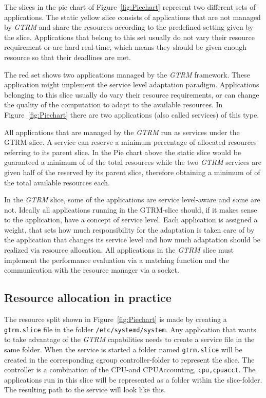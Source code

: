 \documentclass[nobiblatex]{LTHthesis}
\begin{document}
The slices in the pie chart of Figure~\ref{fig:Piechart} represent two
different sets of applications. The static yellow slice consists of
applications that are not managed by \emph{GTRM} and share the resources
according to the predefined setting given by the slice. Applications
that belong to this set usually do not vary their resource requirement
or are hard real-time, which means they should be given enough resource
so that their deadlines are met. 

The red set shows two applications managed by the \emph{GTRM} framework. These
application might implement the service level adaptation paradigm.
Applications belonging to this slice usually do vary their resource
requirements, or can change the quality of the computation to adapt to the
available resources. In Figure~\ref{fig:Piechart} there are two applications
(also called services) of this type.

All applications that are managed by the \emph{GTRM} run as services under the 
GTRM-slice. A service can reserve a minimum percentage of allocated 
resources referring to its parent slice.
In the Pie chart above the static slice would be guaranteed a minimum of 
 of the total resources while the two \emph{GTRM} services are given 
half of the  reserved by its parent slice, therefore obtaining
a minimum of  of the total available resources each.

In the \emph{GTRM} slice, some of the applications are service level-aware and some
 are not. Ideally all applications running in the GTRM-slice should, 
if it makes sense to the application, have a concept of service level.
Each application is assigned a weight, that sets how much responsibility
for the adaptation is taken care of by the application that changes its service
level and how much adaptation should be realized via resource allocation.
All applications in the \emph{GTRM} slice must implement the performance evaluation
via a matching function and the communication with the resource manager via a 
socket.

\subsection{Resource allocation in practice}
The resource split shown in Figure~\ref{fig:Piechart} is made by creating 
a \texttt{gtrm.slice} file in the folder \texttt{/etc/systemd/system}.
Any application that wants to take advantage of the \emph{GTRM} capabilities needs
to create a service file in the same folder. When the service is started a folder named \texttt{gtrm.slice} will be created in the corresponding cgroup controller-folder to represent the slice. The controller is a combination of the CPU-and CPUAccounting, \texttt{cpu,cpuacct}. The applications run in this slice will be represented as a folder within the slice-folder. The resulting path to the service will look like this.
\end{document}
